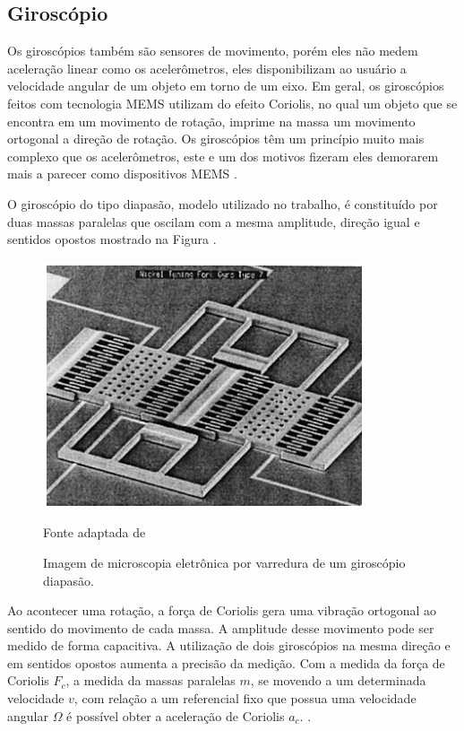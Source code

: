 \subsection{Giroscópio}

Os giroscópios também são sensores de movimento, porém eles não medem aceleração linear como os acelerômetros, eles disponibilizam ao usuário a velocidade angular de um objeto em torno de um eixo. Em geral, os giroscópios feitos com tecnologia MEMS utilizam do efeito Coriolis, no qual um objeto que se encontra em um movimento de rotação, imprime na massa um movimento ortogonal a direção de rotação. Os giroscópios têm um princípio muito mais complexo que os acelerômetros, este e um dos motivos fizeram eles demorarem mais a parecer como dispositivos MEMS \cite{almeida2014}.

O giroscópio do tipo diapasão, modelo utilizado no trabalho, é constituído por duas massas paralelas que oscilam com a mesma amplitude, direção igual e sentidos opostos mostrado na Figura .

\begin{figure}[h]
	\centering
	\includegraphics[keepaspectratio=true,scale=0.7
	]{figuras/diapasao.png}
	\caption{ Imagem de microscopia eletrônica por varredura de um giroscópio diapasão.}
	Fonte adaptada de \cite{forhan2010}
	\label{gyro}	
\end{figure}

Ao acontecer uma rotação, a força de Coriolis gera uma vibração ortogonal ao sentido do movimento de cada massa. A amplitude desse movimento pode ser medido de forma capacitiva. A utilização de dois giroscópios na mesma direção e em sentidos opostos aumenta a precisão da medição. Com a medida da força de Coriolis  $F_{c}$, a medida da massas paralelas $m$, se movendo a um determinada velocidade $v$, com relação a um referencial fixo que possua uma velocidade angular $ \Omega $ é possível obter a aceleração de Coriolis $a_{c}$. \cite{forhan2010}.

